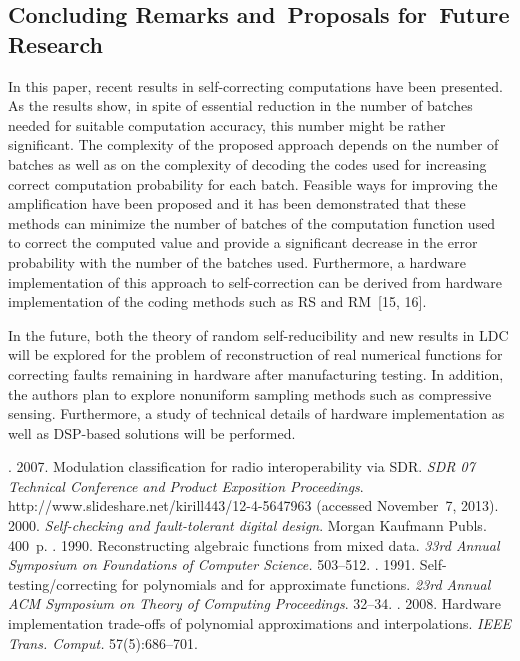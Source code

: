\begin{multicols}{2}
     
\section{Concluding Remarks and~Proposals for~Future Research}
     
\noindent
In this paper, recent results in self-correcting computations have been presented.
     As the results show, in spite of essential reduction in the number of batches needed for suitable computation 
accuracy, this number might be rather significant. The complexity of the proposed
approach depends on the number of\, batches as 
well as on the complexity of decoding the codes used for increasing correct computation probability for each batch. 
Feasible ways  for improving the  amplification have been proposed
and it has been demonstrated that these methods can minimize the number of 
batches of the computation function used to correct the computed value and provide a significant decrease in the error 
probability with the number of the batches used. 
Furthermore, a hardware implementation of this approach to self-correction can be
derived from hardware implementation of the coding methods such as RS and RM~[15, 16].
     
     In the future, both the theory of random self-reducibility and new results in LDC 
will be explored for the problem of reconstruction of real numerical functions for correcting faults remaining in hardware after 
manufacturing testing. In addition, the authors plan to explore nonuniform sampling methods such as compressive sensing. 
Furthermore, a study of technical details of hardware implementation as well as DSP-based solutions will be performed.

{\small\frenchspacing
{%
\begin{thebibliography}{99}
.  2007. 
Modulation classification for radio interoperability via SDR. \textit{SDR 07 Technical Conference and Product Exposition 
Proceedings}. {\sf http://www.slideshare.net/kirill443/12-4-5647963} (accessed November~7, 2013).
 2000. 
\textit{Self-checking and fault-tolerant digital design}. Morgan Kaufmann Publs. 400~p.
. 1990. Reconstructing algebraic functions from mixed data. \textit{33rd 
Annual Symposium on Foundations of Computer Science.} 503--512.
. 1991.
Self-testing/correcting for polynomials and for approximate functions. \textit{23rd Annual ACM Symposium on Theory of 
Computing Proceedings}. 32--34.
. 2008.  Hardware implementation trade-offs of polynomial 
approximations and interpolations. \textit{IEEE Trans. Comput.}  57(5):686--701.


\end{thebibliography}}}
\end{multicols}
